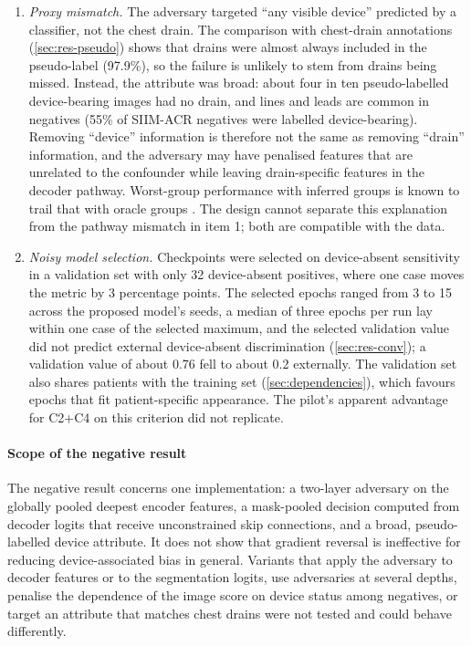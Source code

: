 \documentclass{ieeeaccess}
\begin{document}
\begin{enumerate}
  \item \emph{Proxy mismatch.} The adversary targeted ``any visible device'' predicted by a classifier, not the chest drain. The comparison with chest-drain annotations (\cref{sec:res-pseudo}) shows that drains were almost always included in the pseudo-label (97.9\%), so the failure is unlikely to stem from drains being missed. Instead, the attribute was broad: about four in ten pseudo-labelled device-bearing images had no drain, and lines and leads are common in negatives (55\% of SIIM-ACR negatives were labelled device-bearing). Removing ``device'' information is therefore not the same as removing ``drain'' information, and the adversary may have penalised features that are unrelated to the confounder while leaving drain-specific features in the decoder pathway. Worst-group performance with inferred groups is known to trail that with oracle groups \cite{han2024gic,liu2021jtt}. The design cannot separate this explanation from the pathway mismatch in item 1; both are compatible with the data.
  \item \emph{Noisy model selection.} Checkpoints were selected on device-absent sensitivity in a validation set with only 32 device-absent positives, where one case moves the metric by 3 percentage points. The selected epochs ranged from 3 to 15 across the proposed model's seeds, a median of three epochs per run lay within one case of the selected maximum, and the selected validation value did not predict external device-absent discrimination (\cref{sec:res-conv}); a validation value of about 0.76 fell to about 0.2 externally. The validation set also shares patients with the training set (\cref{sec:dependencies}), which favours epochs that fit patient-specific appearance. The pilot's apparent advantage for C2+C4 on this criterion did not replicate.
\end{enumerate}
\paragraph{Scope of the negative result}
The negative result concerns one implementation: a two-layer adversary on the globally pooled deepest encoder features, a mask-pooled decision computed from decoder logits that receive unconstrained skip connections, and a broad, pseudo-labelled device attribute. It does not show that gradient reversal is ineffective for reducing device-associated bias in general. Variants that apply the adversary to decoder features or to the segmentation logits, use adversaries at several depths, penalise the dependence of the image score on device status among negatives, or target an attribute that matches chest drains were not tested and could behave differently.
\end{document}
